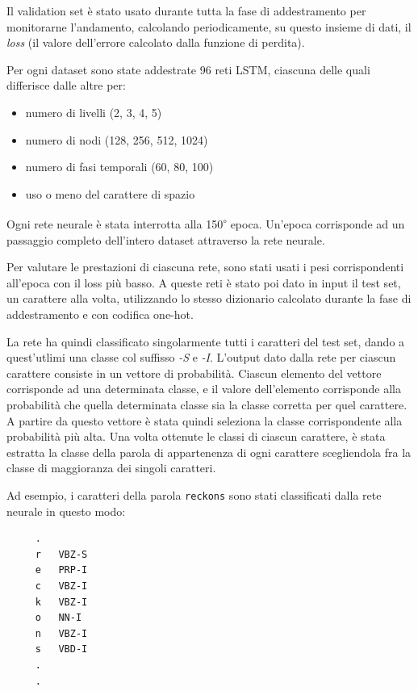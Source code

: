 Il validation set \`e stato usato durante tutta la fase di addestramento per
monitorarne l'andamento, calcolando periodicamente, su questo insieme di dati,
il \emph{loss} (il valore dell'errore calcolato dalla funzione di perdita).

Per ogni dataset sono state addestrate 96 reti LSTM, ciascuna delle quali
differisce dalle altre per:

\begin{itemize}
  \item numero di livelli (2, 3, 4, 5)
  \item numero di nodi (128, 256, 512, 1024)
  \item numero di fasi temporali (60, 80, 100)
  \item uso o meno del carattere di spazio
\end{itemize}

Ogni rete neurale \`e stata interrotta alla 150\textsuperscript{$\circ$} epoca.
Un'epoca corrisponde ad un passaggio completo dell'intero dataset attraverso la
rete neurale.

Per valutare le prestazioni di ciascuna rete, sono stati usati i pesi corrispondenti
all'epoca con il loss pi\`u basso. A queste reti \`e stato poi dato in input il
test set, un carattere alla volta, utilizzando lo stesso dizionario calcolato
durante la fase di addestramento e con codifica one-hot.

La rete ha quindi classificato singolarmente tutti i caratteri del test set,
dando a quest'utlimi una classe col suffisso \emph{-S} e \emph{-I}. L'output
dato dalla rete per ciascun carattere consiste in un vettore di probabilit\`a.
Ciascun elemento del vettore corrisponde ad una determinata classe, e il valore
dell'elemento corrisponde alla probabilit\`a che quella determinata classe sia la
classe corretta per quel carattere. A partire da questo vettore \`e stata quindi
seleziona la classe corrispondente alla probabilit\`a pi\`u alta. Una volta ottenute
le classi di ciascun carattere, \`e stata estratta la classe della parola di appartenenza
di ogni carattere scegliendola fra la classe di maggioranza dei singoli caratteri.

Ad esempio, i caratteri della parola \texttt{reckons} sono stati classificati
dalla rete neurale in questo modo:

\begin{center}
  \begin{minipage}{5cm}
    \begin{verbatim}
     .
     r   VBZ-S
     e   PRP-I
     c   VBZ-I
     k   VBZ-I
     o   NN-I
     n   VBZ-I
     s   VBD-I
     .
     .
    \end{verbatim}
  \end{minipage}
\end{center}

